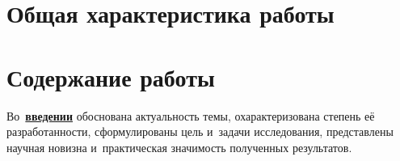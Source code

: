 \section*{Общая характеристика работы}

\newcommand{\actuality}{\pdfbookmark[1]{Актуальность}{actuality}\underline{\textbf{\actualityTXT}}}
\newcommand{\progress}{\pdfbookmark[1]{Разработанность темы}{progress}\underline{\textbf{\progressTXT}}}
\newcommand{\aim}{\pdfbookmark[1]{Цели}{aim}\underline{{\textbf\aimTXT}}}
\newcommand{\tasks}{\pdfbookmark[1]{Задачи}{tasks}\underline{\textbf{\tasksTXT}}}
\newcommand{\aimtasks}{\pdfbookmark[1]{Цели и задачи}{aimtasks}\aimtasksTXT}
\newcommand{\novelty}{\pdfbookmark[1]{Научная новизна}{novelty}\underline{\textbf{\noveltyTXT}}}
\newcommand{\influence}{\pdfbookmark[1]{Практическая значимость}{influence}\underline{\textbf{\influenceTXT}}}
\newcommand{\methods}{\pdfbookmark[1]{Методология и методы исследования}{methods}\underline{\textbf{\methodsTXT}}}
\newcommand{\defpositions}{\pdfbookmark[1]{Положения, выносимые на защиту}{defpositions}\underline{\textbf{\defpositionsTXT}}}
\newcommand{\reliability}{\pdfbookmark[1]{Достоверность}{reliability}\underline{\textbf{\reliabilityTXT}}}
\newcommand{\probation}{\pdfbookmark[1]{Апробация}{probation}\underline{\textbf{\probationTXT}}}
\newcommand{\contribution}{\pdfbookmark[1]{Личный вклад}{contribution}\underline{\textbf{\contributionTXT}}}
\newcommand{\publications}{\pdfbookmark[1]{Публикации}{publications}\underline{\textbf{\publicationsTXT}}}




\section*{Содержание работы}
Во~\underline{\textbf{введении}} обоснована актуальность темы, охарактеризована степень её разработанности, сформулированы цель и~задачи исследования, представлены научная новизна и~практическая значимость полученных результатов.

